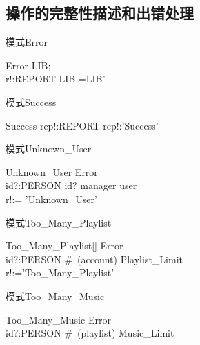 \documentclass[14pt]{article}
\numberwithin{figure}{subsection}
\begin{document}
\subsection{操作的完整性描述和出错处理}
\begin{minipage}[t]{0.5\linewidth}
    \begin{flushleft}
        模式Error
        \vspace*{-0.5cm}
        \begin{schema}{Error}
            \Delta LIB;\\
            r!:REPORT
            \where
            \theta LIB =\theta LIB'\\
        \end{schema}
        \vspace*{-0.5cm}
        模式Success
        \vspace*{-0.1cm}
        \begin{schema}{Success}
            rep!:REPORT
            \where
            rep!:'Success'
        \end{schema}
        \vspace*{-0.5cm}
        模式Unknown\_User
        \vspace*{-0.1cm}
        \begin{schema}{Unknown\_User}
            Error\\
            id?:PERSON
            \where
            id? \not \in manager \cup user\\
            r!:= 'Unknown\_User'
        \end{schema}
        \vspace*{-0.5cm}
        模式Too\_Many\_Playlist
        \vspace*{-0.1cm}
        \begin{schema}{Too\_Many\_Playlist}[\hspace{-0.7cm}]
            Error\\
            id?:PERSON
            \where
            \#~(account) \geq Playlist\_Limit\\
            r!:='Too\_Many\_Playlist'
        \end{schema}
        \vspace*{-0.5cm}
        模式Too\_Many\_Music
        \vspace*{-0.1cm}
        \begin{schema}{Too\_Many\_Music}
            Error\\
            id?:PERSON
            \where
            \#~(playlist) \geq Music\_Limit\\

\end{schema}
\end{flushleft}
\end{minipage}
\end{document}
